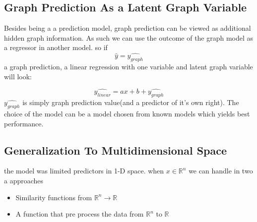 \documentclass[a4paper]{article}
\begin{document}
\subsection{Graph Prediction As a Latent Graph Variable}
Besides being a a prediction model, graph prediction can be viewed as additional hidden graph information.
As such we can use the outcome of the graph model as a regressor 
in another model.
so if 
\begin{equation}
\hat{y}=\hat{y_{graph}}
\end{equation} a graph prediction,
a linear regression with one variable and latent graph variable will look:

\begin{equation}
\hat {y_{linear}}= ax+b+\hat {y_{graph}}
\end{equation}
$ \hat{y_{graph}}$ is simply graph prediction value(and a predictor of it's own right).
The choice of the model can be a model chosen from known models
which yields best performance.

\subsection{Generalization To Multidimensional Space}
the model was limited predictors in 1-D space. when $x\in \mathbb{R}^n$ we can handle in two a approaches
\begin{itemize}
\item  Similarity functions from $\mathbb{R}^n\rightarrow\mathbb{R}$
\item  A  function that pre process the data from $\mathbb{R}^n$ to $\mathbb{R} $
\end{itemize}
\end{document}
